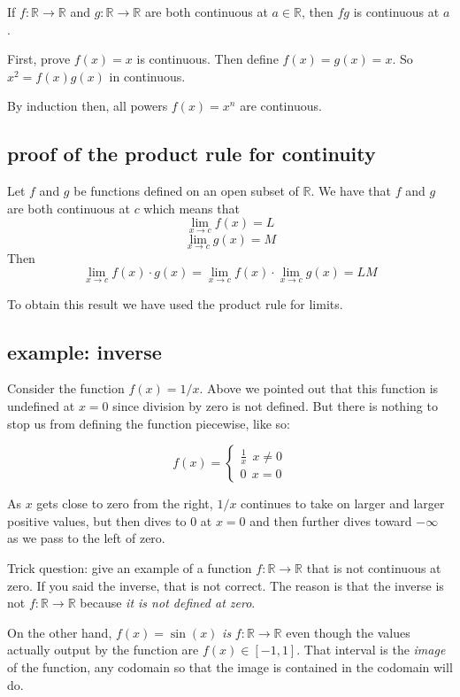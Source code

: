 \documentclass[11pt, oneside]{article}   	%
\begin{document}
If $f: \mathbb{R} \rightarrow \mathbb{R}$ and $g: \mathbb{R} \rightarrow \mathbb{R}$ are both continuous at $a \in  \mathbb{R}$, then $fg$ is continuous at $a$.

First, prove $f(x) = x$ is continuous.  Then define $f(x) = g(x) = x$.  So $x^2 = f(x) g(x)$ in continuous.

By induction then, all powers $f(x) = x^n$ are continuous.

\subsection*{proof of the product rule for continuity}
Let $f$ and $g$ be functions defined on an open subset of $\mathbb{R}$.  We have that $f$ and $g$ are both continuous at $c$ which means that
\[ \lim_{x \rightarrow c} f(x) = L \]
\[ \lim_{x \rightarrow c} g(x) = M \]
Then
\[ \lim_{x \rightarrow c} f(x) \cdot g(x) = \lim_{x \rightarrow c} f(x) \cdot \lim_{x \rightarrow c} g(x) = LM \]

To obtain this result we have used the product rule for limits. 

\subsection*{example:  inverse}
Consider the function $f(x) = 1/x$.  Above we pointed out that this function is undefined at $x=0$ since division by zero is not defined.  But there is nothing to stop us from defining the function piecewise, like so:

\[ f(x) = 
\begin{cases}
\frac{1}{x} \ \ x \ne 0 \\
0 \ \ x = 0 
\end{cases} \]

As $x$ gets close to zero from the right, $1/x$ continues to take on larger and larger positive values, but then dives to $0$ at $x=0$ and then further dives toward $-\infty$ as we pass to the left of zero.

Trick question:  give an example of a function $f : \mathbb{R} \rightarrow \mathbb{R}$ that is not continuous at zero.  If you said the inverse, that is not correct.  The reason is that the inverse is not $f : \mathbb{R} \rightarrow \mathbb{R}$ because \emph{it is not defined at zero}.

On the other hand, $f(x) = \sin(x)$ \emph{is} $f : \mathbb{R} \rightarrow \mathbb{R}$ even though the values actually output by the function are $f(x) \in [-1,1]$.  That interval is the \emph{image} of the function, any codomain so that the image is contained in the codomain will do.
\end{document}
